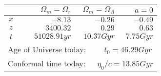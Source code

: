 \begin{tabular}{lrrr}
  \hline\hline
   \rule{0pt}{3ex} & $\Omega_m=\Omega_r$ & $\Omega_m=\Omega_\Lambda$ & $\ddot{a}=0$ \\ [0.5ex]
  \midrule
  \multicolumn{1}{c|}{\rule{0pt}{2ex} $x\quad$} & $-8.13$ & $-0.26$ & $-0.49$ \\ [0.5ex]
  \multicolumn{1}{c|}{$z\quad$} & $3400.32$ & $0.29$ & $0.63$  \\ [0.5ex]
  \multicolumn{1}{c|}{$t\quad$} & $51028.91\unit{yr}$ & $10.37\unit{Gyr}$ & $7.75\unit{Gyr}$ \\ [0.5ex]
  \midrule
  \midrule
  \multicolumn{4}{l}{\rule{0pt}{3ex} Age of Universe today: $\quad\quad t_0=46.29\unit{Gyr}$} \\ 
  \multicolumn{4}{l}{\rule{0pt}{3ex} Conformal time today: $\quad\, \eta_0 / c = 13.85\unit{Gyr}$} \\ [1ex]
  \bottomrule
  \end{tabular}
  